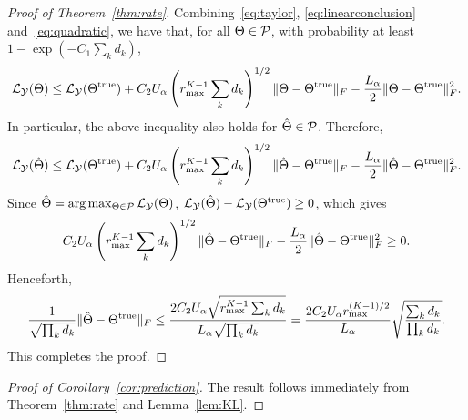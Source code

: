 \documentclass{article}
\theoremstyle{plain}
\theoremstyle{definition}
\begin{document}
\begin{proof}[Proof of Theorem~\ref{thm:rate}]
Combining~\eqref{eq:taylor}, \eqref{eq:linearconclusion} and~\eqref{eq:quadratic}, we have that, for all $\Theta\in\mathcal{P}$, with probability at least $1-\exp(-C_1 \sum_kd_k)$,
\[
\mathcal{L}_{\mathcal{Y}}(\Theta)\leq \mathcal{L}_{\mathcal{Y}}(\Theta^{\mathrm{true}})+C_2U_\alpha  \left(r_{\max}^{K-1}\sum_k d_k\right)^{1/2}  \lVert\Theta-\Theta^{\mathrm{true}}\rVert_F-{L_\alpha\over 2}\lVert\Theta-\Theta^{\mathrm{true}}\rVert_F^2.
\]
In particular, the above inequality also holds for $\hat \Theta\in\mathcal{P}$. Therefore,
\[
\mathcal{L}_{\mathcal{Y}}(\hat \Theta)\leq \mathcal{L}_{\mathcal{Y}}(\Theta^{\mathrm{true}})+C_2U_\alpha \left(r_{\max}^{K-1}\sum_k d_k\right)^{1/2}  \lVert\hat \Theta-\Theta^{\mathrm{true}}\rVert_F-{L_\alpha\over 2} \lVert\hat \Theta-\Theta^{\mathrm{true}}\rVert_F^2.
\]
Since $\hat \Theta=\arg\max_{\Theta\in\mathcal{P}}\mathcal{L}_{\mathcal{Y}}(\Theta)$, $\mathcal{L}_{\mathcal{Y}}(\hat \Theta)-\mathcal{L}_{\mathcal{Y}}(\Theta^{\mathrm{true}})\geq 0$, which gives
\[
C_2U_\alpha \left(r_{\max}^{K-1}\sum_k d_k\right)^{1/2}  \lVert\hat \Theta-\Theta^{\mathrm{true}}\rVert_F-{L_\alpha\over 2}\lVert\hat \Theta-\Theta^{\mathrm{true}}\rVert_F^2\geq 0.
\]
Henceforth,
\[
{1\over \sqrt{\prod_k d_k}} \lVert\hat \Theta-\Theta^{\mathrm{true}}\rVert_F\leq {2C_2U_\alpha \sqrt{r_{\max}^{K-1}\sum_k d_k}\over L_\alpha \sqrt{\prod_k d_k}}={2C_2U_\alpha r_{\max}^{(K-1)/2}\over L_\alpha} \sqrt{ \sum_k d_k \over \prod_k d_k}.
\]
This completes the proof.
\end{proof}

\begin{proof}[Proof of Corollary~\ref{cor:prediction}]
The result follows immediately from Theorem~\ref{thm:rate} and Lemma~\ref{lem:KL}.
\end{proof}
\end{document}
